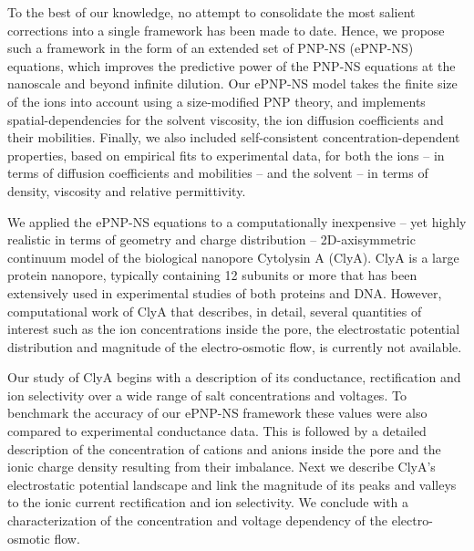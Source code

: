 \documentclass[journal=ancac3,manuscript=article,etalmode=truncate,maxauthors=0,layout=twocolumn]{achemso}
\begin{document}
To the best of our knowledge, no attempt to consolidate the most salient corrections into a single framework
has been made to date. Hence, we propose such a framework in the form of an extended set of PNP-NS (ePNP-NS)
equations, which improves the predictive power of the PNP-NS equations at the nanoscale and beyond infinite
dilution. Our ePNP-NS model takes the finite size of the ions into account using a size-modified PNP
theory,\cite{Lu-2011} and implements spatial-dependencies for the solvent viscosity,\cite{Pronk-2014,
Hsu-2017} the ion diffusion coefficients and their mobilities.\cite{Makarov-1998,Noskov-2004} Finally, we also
included self-consistent concentration-dependent properties, based on empirical fits to experimental data, for
both the ions -- in terms of diffusion coefficients and mobilities\cite{Baldessari-2008-1,Mills-1989} -- and
the solvent -- in terms of density, viscosity\cite{Hai-Lang-1996} and relative permittivity\cite{
Gavish-2016}.

We applied the ePNP-NS equations to a computationally inexpensive -- yet highly realistic in terms of
geometry and charge distribution -- 2D-axisymmetric continuum model of the biological nanopore Cytolysin A
(ClyA).\cite{Soskine-2012} ClyA is a large protein nanopore, typically containing 12
subunits\cite{Mueller-2009} or more\cite{Soskine-2013} that has been extensively used in experimental studies
of both proteins\cite{Soskine-2013,VanMeervelt-2014,Soskine-Biesemans-2015,Biesemans-Soskine-2015,Wloka-2017,
VanMeervelt-2017,Galenkamp-2018} and DNA.\cite{Franceschini-2013,Franceschini-2016} However, computational
work of ClyA that describes, in detail, several quantities of interest such as the ion concentrations inside
the pore, the electrostatic potential distribution and magnitude of the electro-osmotic flow, is currently not
available.

Our study of ClyA begins with a description of its conductance, rectification and ion selectivity over a wide
range of salt concentrations and voltages. To benchmark the accuracy of our ePNP-NS framework these values
were also compared to experimental conductance data. This is followed by a detailed description of the
concentration of cations and anions inside the pore and the ionic charge density resulting from their
imbalance. Next we describe ClyA's electrostatic potential landscape and link the magnitude of its peaks and
valleys to the ionic current rectification and ion selectivity. We conclude with a characterization of the
concentration and voltage dependency of the electro-osmotic flow.
\end{document}
